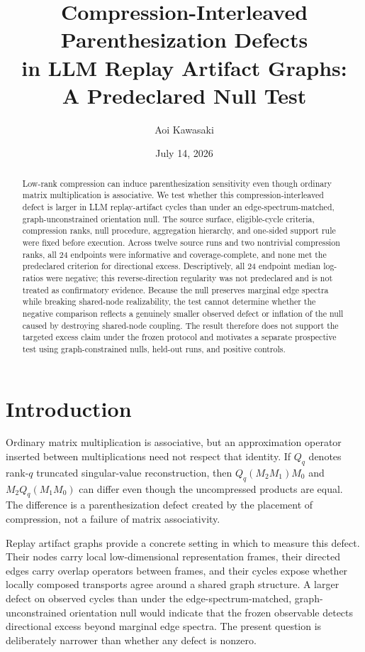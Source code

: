 \documentclass[11pt]{article}
\title{Compression-Interleaved Parenthesization Defects\\
in LLM Replay Artifact Graphs:\\
A Predeclared Null Test}
\author{Aoi Kawasaki}
\date{July 14, 2026}
\newcommand{\Q}{Q}
\begin{document}
\maketitle

\begin{abstract}
Low-rank compression can induce parenthesization sensitivity even though
ordinary matrix multiplication is associative. We test whether this
compression-interleaved defect is larger in LLM replay-artifact cycles than
under an edge-spectrum-matched, graph-unconstrained orientation null. The
source surface, eligible-cycle criteria, compression ranks, null procedure,
aggregation hierarchy, and one-sided support rule were fixed before execution.
Across twelve source runs and two nontrivial compression ranks, all 24
endpoints were informative and coverage-complete, and none met the predeclared
criterion for directional excess. Descriptively, all 24 endpoint median
log-ratios were negative; this reverse-direction regularity was not predeclared
and is not treated as confirmatory evidence. Because the null preserves
marginal edge spectra while breaking shared-node realizability, the test cannot
determine whether the negative comparison reflects a genuinely smaller
observed defect or inflation of the null caused by destroying shared-node
coupling. The result therefore does not support the targeted excess claim under
the frozen protocol and motivates a separate prospective test using
graph-constrained nulls, held-out runs, and positive controls.
\end{abstract}

\section{Introduction}
\label{sec:introduction}

Ordinary matrix multiplication is associative, but an approximation operator
inserted between multiplications need not respect that identity. If \(\Q_q\)
denotes rank-\(q\) truncated singular-value reconstruction, then
\(\Q_q(M_2M_1)M_0\) and \(M_2\Q_q(M_1M_0)\) can differ even though the
uncompressed products are equal. The difference is a parenthesization defect
created by the placement of compression, not a failure of matrix
associativity.

Replay artifact graphs provide a concrete setting in which to measure this
defect. Their nodes carry local low-dimensional representation frames, their
directed edges carry overlap operators between frames, and their cycles expose
whether locally composed transports agree around a shared graph structure. A
larger defect on observed cycles than under the edge-spectrum-matched,
graph-unconstrained orientation null would indicate
that the frozen observable detects directional excess beyond marginal edge
spectra. The present question is deliberately narrower than whether any defect
is nonzero.
\end{document}
